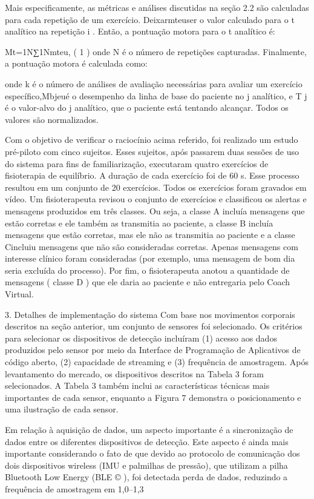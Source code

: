\documentclass[10pt,a4paper,compsoc]{IEEEtran}
\begin{document}
Mais especificamente, as métricas e análises discutidas na seção 2.2 são calculadas para cada repetição de um exercício. Deixarmteuser o valor calculado para o t analítico na repetição i . Então, a pontuação motora para o t analítico é:

Mt=1N∑1Nmteu,    ( 1 )
onde N é o número de repetições capturadas. Finalmente, a pontuação motora é calculada como:

onde k é o número de análises de avaliação necessárias para avaliar um exercício específico,Mbjeué o desempenho da linha de base do paciente no j analítico, e T j é o valor-alvo do j analítico, que o paciente está tentando alcançar. Todos os valores são normalizados.

Com o objetivo de verificar o raciocínio acima referido, foi realizado um estudo pré-piloto com cinco sujeitos. Esses sujeitos, após passarem duas sessões de uso do sistema para fins de familiarização, executaram quatro exercícios de fisioterapia de equilíbrio. A duração de cada exercício foi de 60 s. Esse processo resultou em um conjunto de 20 exercícios. Todos os exercícios foram gravados em vídeo. Um fisioterapeuta revisou o conjunto de exercícios e classificou os alertas e mensagens produzidos em três classes. Ou seja, a classe A incluía mensagens que estão corretas e ele também as transmitia ao paciente, a classe B incluía mensagens que estão corretas, mas ele não as transmitia ao paciente e a classe Cincluiu mensagens que não são consideradas corretas. Apenas mensagens com interesse clínico foram consideradas (por exemplo, uma mensagem de bom dia seria excluída do processo). Por fim, o fisioterapeuta anotou a quantidade de mensagens ( classe D ) que ele daria ao paciente e não entregaria pelo Coach Virtual.

3. Detalhes de implementação do sistema
Com base nos movimentos corporais descritos na seção anterior, um conjunto de sensores foi selecionado. Os critérios para selecionar os dispositivos de detecção incluíram (1) acesso aos dados produzidos pelo sensor por meio da Interface de Programação de Aplicativos de código aberto, (2) capacidade de streaming e (3) frequência de amostragem. Após levantamento do mercado, os dispositivos descritos na Tabela 3 foram selecionados. A Tabela 3 também inclui as características técnicas mais importantes de cada sensor, enquanto a Figura 7 demonstra o posicionamento e uma ilustração de cada sensor.

Em relação à aquisição de dados, um aspecto importante é a sincronização de dados entre os diferentes dispositivos de detecção. Este aspecto é ainda mais importante considerando o fato de que devido ao protocolo de comunicação dos dois dispositivos wireless (IMU e palmilhas de pressão), que utilizam a pilha Bluetooth Low Energy (BLE © ), foi detectada perda de dados, reduzindo a frequência de amostragem em 1,0–1,3%
\end{document}

